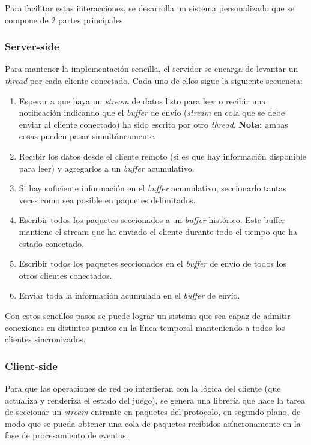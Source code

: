 Para facilitar estas interacciones, se desarrolla un sistema personalizado que se compone de 2 partes principales:

\subsubsection*{Server-side}
Para mantener la implementación sencilla, el servidor se encarga de levantar un \emph{thread} por cada cliente conectado. Cada uno de ellos sigue la siguiente secuencia:

\begin{enumerate}
	\item Esperar a que haya un \emph{stream} de datos listo para leer o recibir una notificación indicando que el \emph{buffer} de envío (\emph{stream} en cola que se debe enviar al cliente conectado) ha sido escrito por otro \emph{thread}. \textbf{Nota:} ambas cosas pueden pasar simultáneamente.
	\item Recibir los datos desde el cliente remoto (si es que hay información disponible para leer) y agregarlos a un \emph{buffer} acumulativo.
	\item Si hay suficiente información en el \emph{buffer} acumulativo, seccionarlo tantas veces como sea posible en paquetes delimitados.
	\item Escribir todos los paquetes seccionados a un \emph{buffer} histórico. Este buffer mantiene el stream que ha enviado el cliente durante todo el tiempo que ha estado conectado.
	\item Escribir todos los paquetes seccionados en el \emph{buffer} de envío de todos los otros clientes conectados.
	\item Enviar toda la información acumulada en el \emph{buffer} de envío.
\end{enumerate}

Con estos sencillos pasos se puede lograr un sistema que sea capaz de admitir conexiones en distintos puntos en la línea temporal manteniendo a todos los clientes sincronizados.

\subsubsection*{Client-side}
Para que las operaciones de red no interfieran con la lógica del cliente (que actualiza y renderiza el estado del juego), se genera una librería que hace la tarea de seccionar un \emph{stream} entrante en paquetes del protocolo, en segundo plano, de modo que se pueda obtener una cola de paquetes recibidos asíncronamente en la fase de procesamiento de eventos.
























